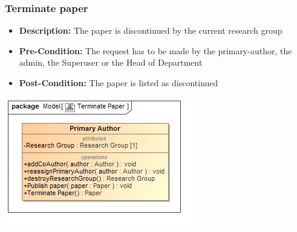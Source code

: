 \documentclass[11pt]{article}
\begin{document}
		\subsubsection{Terminate paper}
		\begin{itemize}
			\item \textbf{Description: }The paper is discontinued by the current research group
			\item \textbf{Pre-Condition: }The request has to be made by the primary-author, the admin, the Superuser or the Head of Department
			\item \textbf{Post-Condition: }The paper is listed as discontinued
		\end{itemize}
		\begin{center}
			\includegraphics[width=\textwidth]{../Diagrams/DomainModel/TerminatePaper.png}\\[0.5cm]
		\end{center}
		\newpage
\end{document}
